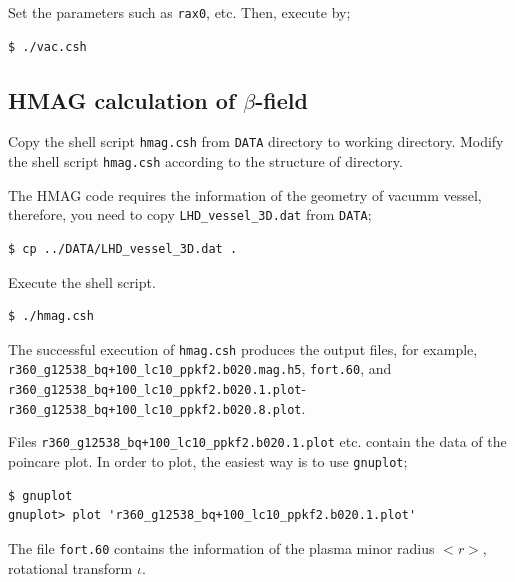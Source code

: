 \documentclass[10pt]{ltxdoc} %
\begin{document}
Set the parameters such as \texttt{rax0}, etc. Then, execute by;
\vspace{-2mm}
\begin{verbatim}
$ ./vac.csh 
\end{verbatim}
\vspace{2mm}


\subsection{HMAG calculation of $\beta$-field}

Copy the shell script \texttt{hmag.csh} from \texttt{DATA} directory to working directory. 
Modify the shell script \texttt{hmag.csh} according to the structure of directory. 

The HMAG code requires the information of the geometry of vacumm vessel, therefore, you need to copy \texttt{LHD\_vessel\_3D.dat} from \texttt{DATA};
\begin{verbatim}
$ cp ../DATA/LHD_vessel_3D.dat .
\end{verbatim}

Execute the shell script.
\vspace{-2mm}
\begin{verbatim}
$ ./hmag.csh
\end{verbatim}
\vspace{5mm}


The successful execution of \texttt{hmag.csh} produces the output files, for example, \texttt{r360\_g12538\_bq+100\_lc10\_ppkf2.b020.mag.h5}, \texttt{fort.60}, and \texttt{r360\_g12538\_bq+100\_lc10\_ppkf2.b020.1.plot}-\texttt{r360\_g12538\_bq+100\_lc10\_ppkf2.b020.8.plot}. 

Files \texttt{r360\_g12538\_bq+100\_lc10\_ppkf2.b020.1.plot} etc. contain the data of the poincare plot. 
In order to plot, the easiest way is to use \texttt{gnuplot};
\vspace{0mm}
\begin{verbatim}
$ gnuplot
gnuplot> plot 'r360_g12538_bq+100_lc10_ppkf2.b020.1.plot'
\end{verbatim}
\vspace{5mm}

The file \texttt{fort.60} contains the information of the plasma minor radius $<r>$, rotational transform $\iota$. 
\end{document}
